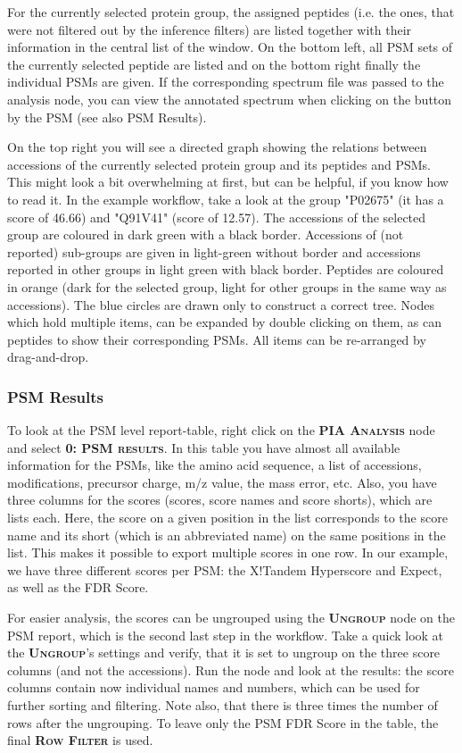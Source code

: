 \documentclass[a4paper,11pt,twoside]{article}
\newcommand{\menu}[1]{{\scshape\bfseries #1}}
\newcommand{\knimenode}[1]{{\scshape\bfseries #1}}
\begin{document}
For the currently selected protein group, the assigned peptides (i.e. the ones,
that were not filtered out by the inference filters) are listed together with
their information in the central list of the window. On the bottom left, all
PSM sets of the currently selected peptide are listed and on the bottom right
finally the individual PSMs are given. If the corresponding spectrum file was
passed to the analysis node, you can view the annotated spectrum when clicking
on the button by the PSM (see also PSM Results).

On the top right you will see a directed graph showing the relations between
accessions of the currently selected protein group and its peptides and PSMs.
This might look a bit overwhelming at first, but can be helpful, if you know
how to read it. In the example workflow, take a look at the group "P02675" (it
has a score of 46.66) and "Q91V41" (score of 12.57). The accessions of the
selected group are coloured in dark green with a black border. Accessions of
(not reported) sub-groups are given in light-green without border and accessions
reported in other groups in light green with black border. Peptides are coloured
in orange (dark for the selected group, light for other groups in the same way
as accessions). The blue circles are drawn only to construct a correct tree.
Nodes which hold multiple items, can be expanded by double clicking on them, as
can peptides to show their corresponding PSMs. All items can be re-arranged by
drag-and-drop.


\subsubsection{PSM Results}

To look at the PSM level report-table, right click on the \knimenode{PIA
Analysis} node and select \menu{0: PSM results}. In this table you have almost
all available information for the PSMs, like the amino acid sequence, a list of
accessions, modifications, precursor charge, m/z value, the mass error, etc.
Also, you have three columns for the scores (scores, score names and score
shorts), which are lists each. Here, the score on a given position in the list
corresponds to the score name and its short (which is an abbreviated name) on
the same positions in the list. This makes it possible to export multiple scores
in one row. In our example, we have three different scores per PSM: the
X!Tandem Hyperscore and Expect, as well as the FDR Score.

For easier analysis, the scores can be ungrouped using the \knimenode{Ungroup}
node on the PSM report, which is the second last step in the workflow. Take a
quick look at the \knimenode{Ungroup}'s settings and verify, that it is set to
ungroup on the three score columns (and not the accessions). Run the node and
look at the results: the score columns contain now individual names and
numbers, which can be used for further sorting and filtering. Note also, that
there is three times the number of rows after the ungrouping. To leave only the
PSM FDR Score in the table, the final \knimenode{Row Filter} is used.
\end{document}
